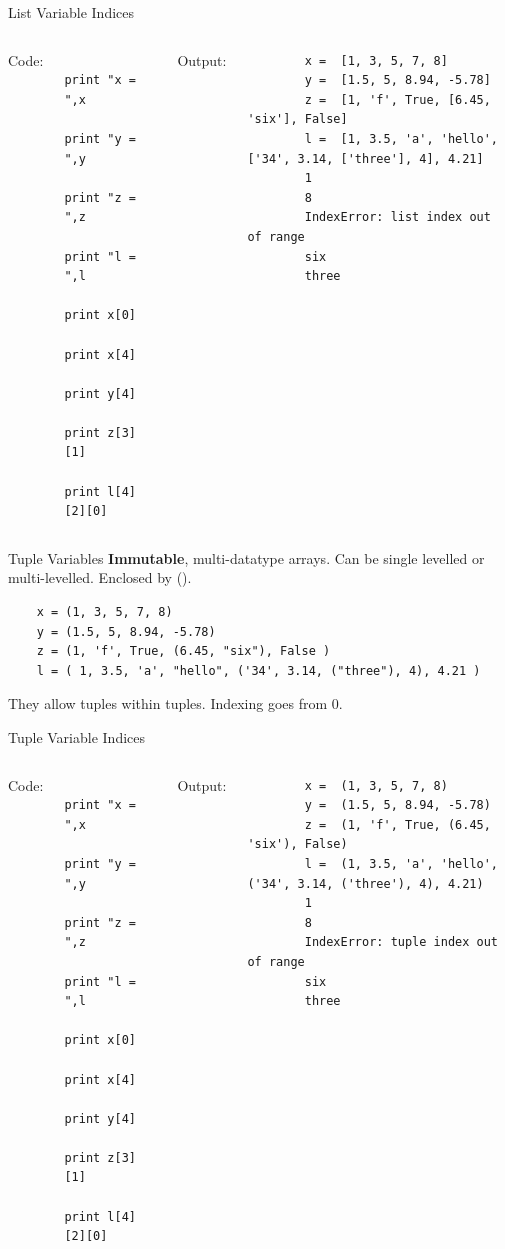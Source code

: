 \documentclass[10pt]{beamer}
\begin{document}
\begin{frame}[fragile]{List Variable Indices}
\begin{columns}[t]
	Code:
	\begin{lstlisting}
		print "x = ",x
		print "y = ",y
		print "z = ",z
		print "l = ",l
		print x[0]
		print x[4]
		print y[4]
		print z[3][1]
		print l[4][2][0]
	\end{lstlisting}
	Output:
	\begin{lstlisting}
		x =  [1, 3, 5, 7, 8]
		y =  [1.5, 5, 8.94, -5.78]
		z =  [1, 'f', True, [6.45, 'six'], False]
		l =  [1, 3.5, 'a', 'hello', ['34', 3.14, ['three'], 4], 4.21]
		1
		8
		IndexError: list index out of range
		six
		three
	\end{lstlisting}
\end{columns}
\end{frame}

\begin{frame}[fragile]{Tuple Variables}
\textbf{Immutable}, multi-datatype arrays. Can be single levelled or multi-levelled. Enclosed by ().

\begin{lstlisting}
	x = (1, 3, 5, 7, 8)
	y = (1.5, 5, 8.94, -5.78)
	z = (1, 'f', True, (6.45, "six"), False )
	l = ( 1, 3.5, 'a', "hello", ('34', 3.14, ("three"), 4), 4.21 )
\end{lstlisting}

They allow tuples within tuples. Indexing goes from 0.
\end{frame}

\begin{frame}[fragile]{Tuple Variable Indices}
\begin{columns}[t]
	Code:
	\begin{lstlisting}
		print "x = ",x
		print "y = ",y
		print "z = ",z
		print "l = ",l
		print x[0]
		print x[4]
		print y[4]
		print z[3][1]
		print l[4][2][0]
	\end{lstlisting}
	Output:
	\begin{lstlisting}
		x =  (1, 3, 5, 7, 8)
		y =  (1.5, 5, 8.94, -5.78)
		z =  (1, 'f', True, (6.45, 'six'), False)
		l =  (1, 3.5, 'a', 'hello', ('34', 3.14, ('three'), 4), 4.21)
		1
		8
		IndexError: tuple index out of range
		six
		three
	\end{lstlisting}
\end{columns}
\end{frame}
\end{document}
